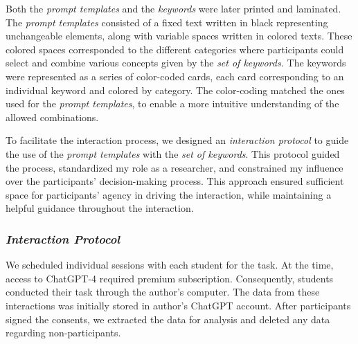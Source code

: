 \documentclass[sn-mathphys, Numbered]{sn-jnl}%
\theoremstyle{thmstyleone}%
\theoremstyle{thmstyletwo}%
\theoremstyle{thmstylethree}%
\begin{document}
Both the \textit{prompt templates} and the \textit{keywords} were later printed and laminated. The \textit{prompt templates} consisted of a fixed text written in black representing unchangeable elements, along with variable spaces written in colored texts. These colored spaces corresponded to the different categories where participants could select and combine various concepts given by the \textit{set of keywords.} The keywords were represented as a series of color-coded cards, each card corresponding to an individual keyword and colored by category. The color-coding matched the ones used for the \textit{prompt templates}, to enable a more intuitive understanding of the allowed combinations.

To facilitate the interaction process, we designed an \textit{interaction protocol} to guide the use of the \textit{prompt templates} with the \textit{set of keywords}. This protocol guided the process, standardized my role as a researcher, and constrained my influence over the participants' decision-making process. This approach ensured sufficient space for participants' agency in driving the interaction, while maintaining a helpful guidance throughout the interaction.

\subsubsection*{\textit{Interaction Protocol}}

We scheduled individual sessions with each student for the task. At the time, access to ChatGPT-4 required premium subscription. Consequently, students conducted their task through the author's computer. The data from these interactions was initially stored in author's ChatGPT account. After participants signed the consents, we extracted the data for analysis and deleted any data regarding non-participants.
\end{document}
